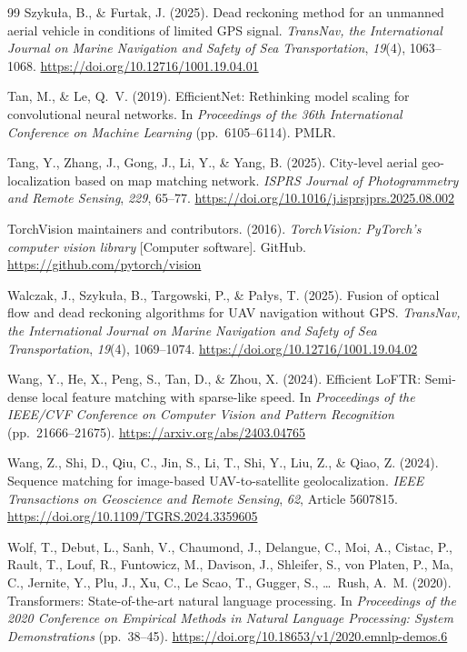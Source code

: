 \documentclass[english, Lau, oneside]{sapthesis}%
\begin{document}
\begin{thebibliography}{99}
Szyku{\l}a, B., \& Furtak, J. (2025).
Dead reckoning method for an unmanned aerial vehicle in conditions of limited GPS signal.
\textit{TransNav, the International Journal on Marine Navigation and Safety of Sea Transportation}, \textit{19}(4), 1063--1068. \url{https://doi.org/10.12716/1001.19.04.01}

Tan, M., \& Le, Q.~V. (2019).
EfficientNet: Rethinking model scaling for convolutional neural networks.
In \textit{Proceedings of the 36th International Conference on Machine Learning} (pp.~6105--6114). PMLR.

Tang, Y., Zhang, J., Gong, J., Li, Y., \& Yang, B. (2025).
City-level aerial geo-localization based on map matching network.
\textit{ISPRS Journal of Photogrammetry and Remote Sensing}, \textit{229}, 65--77. \url{https://doi.org/10.1016/j.isprsjprs.2025.08.002}

TorchVision maintainers and contributors. (2016).
\textit{TorchVision: PyTorch's computer vision library} [Computer software].
GitHub. \url{https://github.com/pytorch/vision}

Walczak, J., Szyku{\l}a, B., Targowski, P., \& Pa{\l}ys, T. (2025).
Fusion of optical flow and dead reckoning algorithms for UAV navigation without GPS.
\textit{TransNav, the International Journal on Marine Navigation and Safety of Sea Transportation}, \textit{19}(4), 1069--1074. \url{https://doi.org/10.12716/1001.19.04.02}

Wang, Y., He, X., Peng, S., Tan, D., \& Zhou, X. (2024).
Efficient LoFTR: Semi-dense local feature matching with sparse-like speed.
In \textit{Proceedings of the IEEE/CVF Conference on Computer Vision and Pattern Recognition} (pp.~21666--21675). \url{https://arxiv.org/abs/2403.04765}

Wang, Z., Shi, D., Qiu, C., Jin, S., Li, T., Shi, Y., Liu, Z., \& Qiao, Z. (2024).
Sequence matching for image-based UAV-to-satellite geolocalization.
\textit{IEEE Transactions on Geoscience and Remote Sensing}, \textit{62}, Article 5607815. \url{https://doi.org/10.1109/TGRS.2024.3359605}

Wolf, T., Debut, L., Sanh, V., Chaumond, J., Delangue, C., Moi, A., Cistac, P., Rault, T., Louf, R., Funtowicz, M., Davison, J., Shleifer, S., von Platen, P., Ma, C., Jernite, Y., Plu, J., Xu, C., Le Scao, T., Gugger, S., \ldots\ Rush, A.~M. (2020).
Transformers: State-of-the-art natural language processing.
In \textit{Proceedings of the 2020 Conference on Empirical Methods in Natural Language Processing: System Demonstrations} (pp.~38--45). \url{https://doi.org/10.18653/v1/2020.emnlp-demos.6}


\end{thebibliography}
\end{document}
